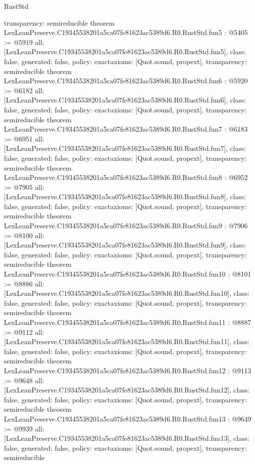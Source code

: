 \begin{lexlean}{RustStd}
\begin{coremodule}
{  transparency: semireducible
}
theorem LexLeanPreserve.C19345538201a5ca07fe81623ac5389d6.R0.RustStd.fun5 : @5405 := @5919 {
  all: [LexLeanPreserve.C19345538201a5ca07fe81623ac5389d6.R0.RustStd.fun5],
  class: false,
  generated: false,
  policy: exact{axioms: [Quot.sound, propext]},
  transparency: semireducible
}
theorem LexLeanPreserve.C19345538201a5ca07fe81623ac5389d6.R0.RustStd.fun6 : @5920 := @6182 {
  all: [LexLeanPreserve.C19345538201a5ca07fe81623ac5389d6.R0.RustStd.fun6],
  class: false,
  generated: false,
  policy: exact{axioms: [Quot.sound, propext]},
  transparency: semireducible
}
theorem LexLeanPreserve.C19345538201a5ca07fe81623ac5389d6.R0.RustStd.fun7 : @6183 := @6951 {
  all: [LexLeanPreserve.C19345538201a5ca07fe81623ac5389d6.R0.RustStd.fun7],
  class: false,
  generated: false,
  policy: exact{axioms: [Quot.sound, propext]},
  transparency: semireducible
}
theorem LexLeanPreserve.C19345538201a5ca07fe81623ac5389d6.R0.RustStd.fun8 : @6952 := @7905 {
  all: [LexLeanPreserve.C19345538201a5ca07fe81623ac5389d6.R0.RustStd.fun8],
  class: false,
  generated: false,
  policy: exact{axioms: [Quot.sound, propext]},
  transparency: semireducible
}
theorem LexLeanPreserve.C19345538201a5ca07fe81623ac5389d6.R0.RustStd.fun9 : @7906 := @8100 {
  all: [LexLeanPreserve.C19345538201a5ca07fe81623ac5389d6.R0.RustStd.fun9],
  class: false,
  generated: false,
  policy: exact{axioms: [Quot.sound, propext]},
  transparency: semireducible
}
theorem LexLeanPreserve.C19345538201a5ca07fe81623ac5389d6.R0.RustStd.fun10 : @8101 := @8886 {
  all: [LexLeanPreserve.C19345538201a5ca07fe81623ac5389d6.R0.RustStd.fun10],
  class: false,
  generated: false,
  policy: exact{axioms: [Quot.sound, propext]},
  transparency: semireducible
}
theorem LexLeanPreserve.C19345538201a5ca07fe81623ac5389d6.R0.RustStd.fun11 : @8887 := @9112 {
  all: [LexLeanPreserve.C19345538201a5ca07fe81623ac5389d6.R0.RustStd.fun11],
  class: false,
  generated: false,
  policy: exact{axioms: [Quot.sound, propext]},
  transparency: semireducible
}
theorem LexLeanPreserve.C19345538201a5ca07fe81623ac5389d6.R0.RustStd.fun12 : @9113 := @9648 {
  all: [LexLeanPreserve.C19345538201a5ca07fe81623ac5389d6.R0.RustStd.fun12],
  class: false,
  generated: false,
  policy: exact{axioms: [Quot.sound, propext]},
  transparency: semireducible
}
theorem LexLeanPreserve.C19345538201a5ca07fe81623ac5389d6.R0.RustStd.fun13 : @9649 := @9939 {
  all: [LexLeanPreserve.C19345538201a5ca07fe81623ac5389d6.R0.RustStd.fun13],
  class: false,
  generated: false,
  policy: exact{axioms: [Quot.sound, propext]},
  transparency: semireducible
}
\end{coremodule}
\end{lexlean}
